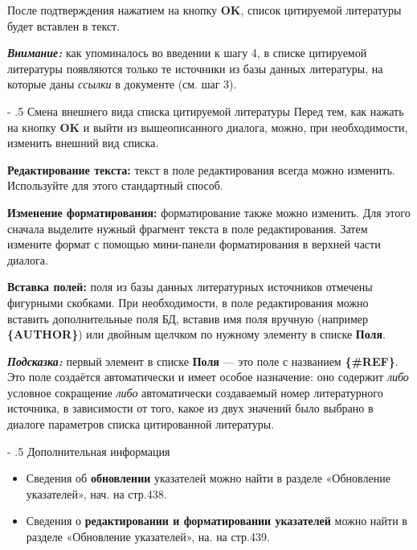 ﻿\documentclass[a4paper,10pt]{article}
\makeatletter
\renewcommand\paragraph{%
   \@startsection{paragraph}{4}{0mm}%
      {-\baselineskip}%
      {.5\baselineskip}%
      {\normalfont\normalsize\bfseries}}
\makeatother
\begin{document}
После подтверждения нажатием на кнопку \textbf{OK}, список цитируемой литературы будет вставлен в текст.

\begin{mdframed}[backgroundcolor=blue!10]
\textbf{\textit{Внимание:}} как упоминалось во введении к шагу 4, в списке цитируемой литературы появляются только те источники из базы данных литературы, на которые даны \textit{ссылки} в документе (см. шаг 3).
\end{mdframed}

\paragraph{Смена внешнего вида списка цитируемой литературы}
Перед тем, как нажать на кнопку \textbf{OK} и выйти из вышеописанного диалога, можно, при необходимости, изменить внешний вид списка.

\textbf{Редактирование текста:} текст в поле редактирования всегда можно изменить. Используйте для этого стандартный способ.

\textbf{Изменение форматирования:} форматирование также можно изменить. Для этого сначала выделите нужный фрагмент текста в поле редактирования. Затем измените формат с помощью мини-панели форматирования в верхней части диалога.

\textbf{Вставка полей:} поля из базы данных литературных источников отмечены фигурными скобками. При необходимости, в поле редактирования можно вставить дополнительные поля БД, вставив имя поля вручную (например \textbf{\{AUTHOR\}}) или двойным щелчком по нужному элементу в списке \textbf{Поля}.

\pagebreak

\begin{mdframed}[backgroundcolor=blue!10]
\textbf{\textit{Подсказка:}} первый элемент в списке \textbf{Поля} — это поле с названием \textbf{\{\#REF\}}. Это поле создаётся автоматически и имеет особое назначение: оно содержит \textit{либо} условное сокращение \textit{либо} автоматически создаваемый номер литературного источника, в зависимости от того, какое из двух значений было выбрано в диалоге параметров списка цитированной литературы.
\end{mdframed}

\paragraph{Дополнительная информация}
\begin{itemize}
 \item Сведения об \textbf{обновлении} указателей можно найти в разделе «Обновление указателей», нач. на стр.438.
 \item Сведения о \textbf{редактировании и форматировании указателей} можно найти в разделе «Обновление указателей», на. на стр.439.
\end{itemize}
\end{document}
